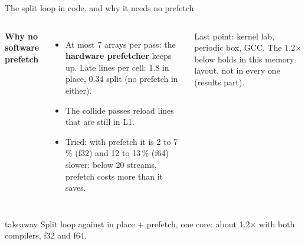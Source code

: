 \documentclass[aspectratio=169,10pt,t]{beamer}
\newcommand{\sx}[1]{#1\ensuremath{\times}} %
\newcommand{\term}[1]{\textcolor{psblue!85!black}{\textbf{#1}}} %
\newcommand{\takeaway}[1]{\par\vfill
  \begin{beamercolorbox}[wd=\textwidth,sep=4pt,rounded=true]{takeaway}
    \small #1
  \end{beamercolorbox}}
\begin{document}
\begin{frame}{The split loop in code, and why it needs no prefetch}
  \begin{columns}[T,onlytextwidth]
    \vspace{0.5mm}
    
    \vspace{1mm}
    {\small\bfseries Why no software prefetch\par}
    \vspace{1mm}
    \begin{itemize}\small
      \item At most 7 arrays per pass: the \term{hardware prefetcher} keeps up. Late lines per cell:
            1.8 in place, 0.34 split (no prefetch in either).
      \item The collide passes reload lines that are still in L1.
      \item Tried: with prefetch it is 2 to 7\,\% (f32) and 12 to 13\,\% (f64) slower: below 20
            streams, prefetch costs more than it saves.
    \end{itemize}
    \vspace{1mm}
    {\scriptsize\color{psgray}Last point: kernel lab, periodic box, GCC. The \sx{1.2} below holds in this
    memory layout, not in every one (results part).\par}
  \end{columns}
  \takeaway{Split loop against in place + prefetch, one core: about \sx{1.2} with both compilers, f32 and f64.}
\end{frame}
\end{document}

